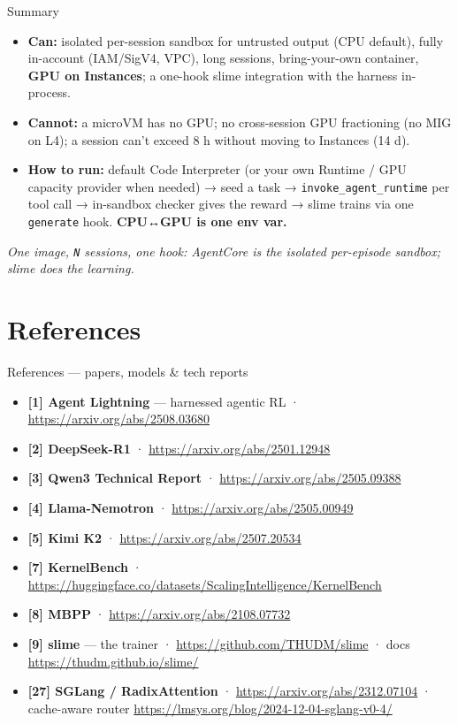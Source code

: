 \documentclass[
  10pt,
  ignorenonframetext,
  aspectratio=169,
  t]{beamer}
\providecommand{\tightlist}{%
  \setlength{\itemsep}{0pt}\setlength{\parskip}{0pt}}
\begin{document}
\begin{frame}{Summary}
\protect\hypertarget{summary}{}
\begin{itemize}
\tightlist
\item
  \textbf{Can:} isolated per-session sandbox for untrusted output (CPU
  default), fully in-account (IAM/SigV4, VPC), long sessions,
  bring-your-own container, \textbf{GPU on Instances}; a one-hook slime
  integration with the harness in-process.
\item
  \textbf{Cannot:} a microVM has no GPU; no cross-session GPU
  fractioning (no MIG on L4); a session can't exceed 8 h without moving
  to Instances (14 d).
\item
  \textbf{How to run:} default Code Interpreter (or your own Runtime /
  GPU capacity provider when needed) → seed a task →
  \texttt{invoke\_agent\_runtime} per tool call → in-sandbox checker
  gives the reward → slime trains via one \texttt{generate} hook.
  \textbf{CPU↔GPU is one env var.}
\end{itemize}

\emph{One image, \texttt{N} sessions, one hook: AgentCore is the
isolated per-episode sandbox; slime does the learning.}
\end{frame}

\hypertarget{references}{%
\section{References}\label{references}}

\begin{frame}[allowframebreaks]{References --- papers, models \& tech reports}
\protect\hypertarget{references-papers-models-tech-reports}{}
\begin{itemize}
\tightlist
\item
  \textbf{{[}1{]} Agent Lightning} --- harnessed agentic RL ·
  \url{https://arxiv.org/abs/2508.03680}
\item
  \textbf{{[}2{]} DeepSeek-R1} · \url{https://arxiv.org/abs/2501.12948}
\item
  \textbf{{[}3{]} Qwen3 Technical Report} ·
  \url{https://arxiv.org/abs/2505.09388}
\item
  \textbf{{[}4{]} Llama-Nemotron} ·
  \url{https://arxiv.org/abs/2505.00949}
\item
  \textbf{{[}5{]} Kimi K2} · \url{https://arxiv.org/abs/2507.20534}
\item
  \textbf{{[}7{]} KernelBench} ·
  \url{https://huggingface.co/datasets/ScalingIntelligence/KernelBench}
\item
  \textbf{{[}8{]} MBPP} · \url{https://arxiv.org/abs/2108.07732}
\item
  \textbf{{[}9{]} slime} --- the trainer ·
  \url{https://github.com/THUDM/slime} · docs
  \url{https://thudm.github.io/slime/}
\item
  \textbf{{[}27{]} SGLang / RadixAttention} ·
  \url{https://arxiv.org/abs/2312.07104} · cache-aware router
  \url{https://lmsys.org/blog/2024-12-04-sglang-v0-4/}
\end{itemize}
\end{frame}
\end{document}
